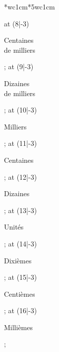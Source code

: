 {{{\begin{center}
\begin{NiceTabular}{*{}{wc{1cm}}*{5}{wc{1cm}}}
{          \tikz\node[rotate=58] at (8|-3) {\begin{minipage}{1.5cm}\begin{center}\scriptsize Centaines\\de milliers\end{center}\end{minipage}};
          \tikz\node[rotate=58] at (9|-3) {\begin{minipage}{1.5cm}\begin{center}\scriptsize Dizaines\\de milliers\end{center}\end{minipage}};
          \tikz\node[rotate=58] at (10|-3) {\begin{minipage}{1.5cm}\begin{center}\scriptsize Milliers\end{center}\end{minipage}};
          \tikz\node[rotate=58] at (11|-3) {\begin{minipage}{1.5cm}\begin{center}\scriptsize Centaines\end{center}\end{minipage}};
          \tikz\node[rotate=58] at (12|-3) {\begin{minipage}{1.5cm}\begin{center}\scriptsize Dizaines\end{center}\end{minipage}};
          \tikz\node[rotate=58] at (13|-3) {\begin{minipage}{1.5cm}\begin{center}\scriptsize Unités\end{center}\end{minipage}};
          \tikz\node[rotate=58] at (14|-3) {\begin{minipage}{1.5cm}\begin{center}\scriptsize Dixièmes\end{center}\end{minipage}};
          \tikz\node[rotate=58] at (15|-3) {\begin{minipage}{1.5cm}\begin{center}\scriptsize Centièmes\end{center}\end{minipage}};
          \tikz\node[rotate=58] at (16|-3) {\begin{minipage}{1.5cm}\begin{center}\scriptsize Millièmes\end{center}\end{minipage}};
}
\end{NiceTabular}
\end{center}}}}
